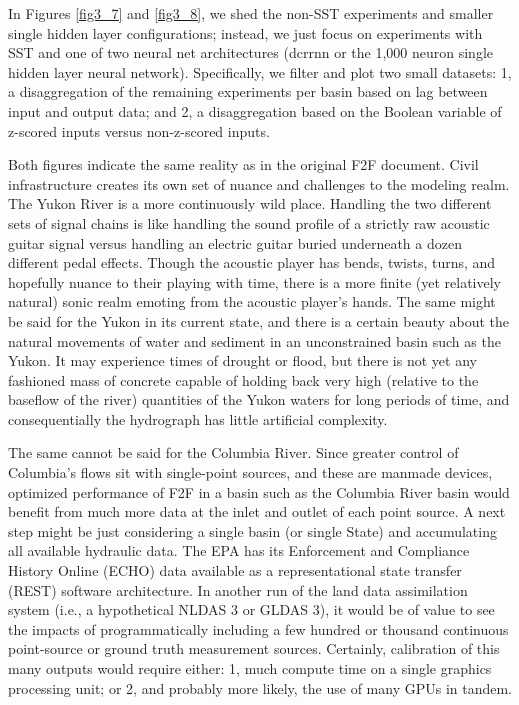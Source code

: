 \begin{refsection}
In Figures \ref{fig3_7} and \ref{fig3_8}, we shed the non-SST experiments and smaller single hidden layer configurations; instead, we just focus on experiments with SST and one of two neural net architectures (dcrrnn or the 1,000 neuron single hidden layer neural network). Specifically, we filter and plot two small datasets: 1, a disaggregation of the remaining experiments per basin based on lag between input and output data; and 2, a disaggregation based on the Boolean variable of z-scored inputs versus non-z-scored inputs.  

Both figures indicate the same reality as in the original F2F document. Civil infrastructure creates its own set of nuance and challenges to the modeling realm. The Yukon River is a more continuously wild place. Handling the two different sets of signal chains is like handling the sound profile of a strictly raw acoustic guitar signal versus handling an electric guitar buried underneath a dozen different pedal effects. Though the acoustic player has bends, twists, turns, and hopefully nuance to their playing with time, there is a more finite (yet relatively natural) sonic realm emoting from the acoustic player’s hands. The same might be said for the Yukon in its current state, and there is a certain beauty about the natural movements of water and sediment in an unconstrained basin such as the Yukon. It may experience times of drought or flood, but there is not yet any fashioned mass of concrete capable of holding back very high (relative to the baseflow of the river) quantities of the Yukon waters for long periods of time, and consequentially the hydrograph has little artificial complexity. 

The same cannot be said for the Columbia River. Since greater control of Columbia’s flows sit with single-point sources, and these are manmade devices, optimized performance of F2F in a basin such as the Columbia River basin would benefit from much more data at the inlet and outlet of each point source. A next step might be just considering a single basin (or single State) and accumulating all available hydraulic data. The EPA has its Enforcement and Compliance History Online (ECHO) data available as a representational state transfer (REST) software architecture. In another run of the land data assimilation system (i.e., a hypothetical NLDAS 3 or GLDAS 3), it would be of value to see the impacts of programmatically including a few hundred or thousand continuous point-source or ground truth measurement sources. Certainly, calibration of this many outputs would require either: 1, much compute time on a single graphics processing unit; or 2, and probably more likely, the use of many GPUs in tandem.


\end{refsection}
